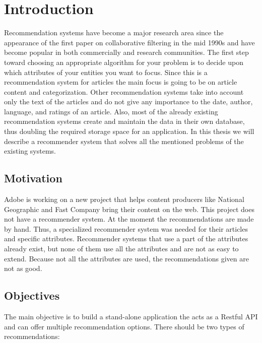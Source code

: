 \chapter{Introduction}
\label{chapter:intro}

Recommendation systems have become a major research area since the appearance of the first paper on collaborative filtering in the mid 1990s and have become popular in both commercially and research communities. The first step toward choosing an appropriate algorithm for your problem is to decide upon which attributes of your entities you want to focus. Since this is a recommendation system for articles the main focus is going to be on article content and categorization. Other recommendation systems take into account only the text of the articles and do not give any importance to the date, author, language, and ratings of an article. Also, most of the already existing recommendation systems create and maintain the data in their own database, thus doubling the required storage space for an application. In this thesis we will describe a recommender system that solves all the mentioned problems of the existing systems.\\

\section{Motivation}
\label{sec:motivation}
Adobe is working on a new project that helps content producers like National Geographic and Fast Company bring their content on the web. This project does not have a recommender system. At the moment the recommendations are made by hand. Thus, a specialized recommender system was needed for their articles and specific attributes. Recommender systems that use a part of the attributes already exist, but none of them use all the attributes and are not as easy to extend. Because not all the attributes are used, the recommendations given are not as good.

\section{Objectives}
\label{sec:objectives}
The main objective is to build a stand-alone application the acts as a Restful API and can offer multiple recommendation options. There should be two types of recommendations:

